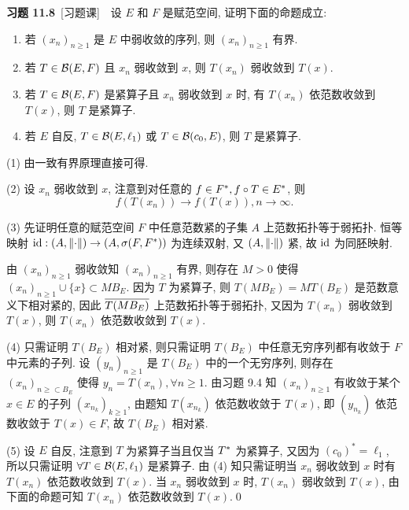 	\textbf{习题 11.8}\ [习题课]\ \ 设 $ E $ 和 $ F $ 是赋范空间, 证明下面的命题成立:
	\begin{enumerate}[(1)]
		\item 若 $ (x_{n})_{n\geqslant1} $ 是 $ E $ 中弱收敛的序列, 则 $ (x_{n})_{n\geqslant1} $ 有界.
		\item 若 $ T\in\CB(E, F) $ 且 $ x_{n} $ 弱收敛到 $ x $, 则 $ T(x_{n}) $ 弱收敛到 $ T(x) $.
		\item 若 $ T\in\CB(E, F) $ 是紧算子且 $ x_{n} $ 弱收敛到 $ x $ 时, 有 $ T(x_{n}) $ 依范数收敛到 $ T(x) $, 则 $ T $ 是紧算子. 
		\item 若 $ E $ 自反, $ T\in\CB(E, \ell_{1}) $ 或 $ T\in\CB(c_{0}, E) $, 则 $ T $ 是紧算子.
	\end{enumerate}
	\begin{Proof}
		(1) 由一致有界原理直接可得.

		(2) 设 $ x_{n} $ 弱收敛到 $ x $, 注意到对任意的 $ f\in\Star{F}, f\circ T\in\Star{E} $, 则
		\[
			f(T(x_{n}))\to f(T(x)), n\to\infty.
		\]

		(3) 先证明任意的赋范空间 $ F $ 中任意范数紧的子集 $ A $ 上范数拓扑等于弱拓扑. 恒等映射 $ \id: (A, \norm{\cdot})\to (A, \sigma(F, \Star{F})) $ 为连续双射, 又 $ (A, \norm{\cdot}) $ 紧, 故 $ \id $ 为同胚映射.
		
		由 $ (x_{n})_{n\geqslant1} $ 弱收敛知 $ (x_{n})_{n\geqslant1} $ 有界, 则存在 $ M>0 $ 使得 $ (x_{n})_{n\geqslant 1}\cup\{ x \}\subset MB_{E} $. 因为 $ T $ 为紧算子, 则 $ T(MB_{E})=MT(B_{E}) $ 是范数意义下相对紧的, 因此 $ \baro{T(MB_{E})} $ 上范数拓扑等于弱拓扑, 又因为 $ T(x_{n}) $ 弱收敛到 $ T(x) $, 则 $ T(x_{n}) $ 依范数收敛到 $ T(x) $.

		(4) 只需证明 $ T(B_{E}) $ 相对紧, 则只需证明 $ T(B_{E}) $ 中任意无穷序列都有收敛于 $ F $ 中元素的子列. 设 $ (y_{n})_{n\geqslant1} $ 是 $ T(B_{E}) $ 中的一个无穷序列, 则存在 $ (x_{n})_{n\geqslant \subset B_{E}} $ 使得 $ y_{n}=T(x_{n}), \forall n\geqslant1 $. 由习题 9.4 知 $ (x_{n})_{n\geqslant1} $ 有收敛于某个 $ x\in E $ 的子列 $ (x_{n_{k}})_{k\geqslant1} $, 由题知 $ T(x_{n_{k}}) $ 依范数收敛于 $ T(x) $, 即 $ (y_{n_{k}}) $ 依范数收敛于 $ T(x)\in F $, 故 $ T(B_{E}) $ 相对紧.

		(5) 设 $ E $ 自反, 注意到 $ T $ 为紧算子当且仅当 $ \Star{T} $ 为紧算子, 又因为 $ (c_{0})^{*}=\ell_{1} $, 所以只需证明 $ \forall T\in \CB(E, \ell_{1}) $ 是紧算子. 由 (4) 知只需证明当 $ x_{n} $ 弱收敛到 $ x $ 时有 $ T(x_{n}) $ 依范数收敛到 $ T(x) $. 当 $ x_{n} $ 弱收敛到 $ x $ 时, $ T(x_{n}) $ 弱收敛到 $ T(x) $, 由下面的命题可知 $ T(x_{n}) $ 依范数收敛到 $ T(x) $.\qed
	\end{Proof}
